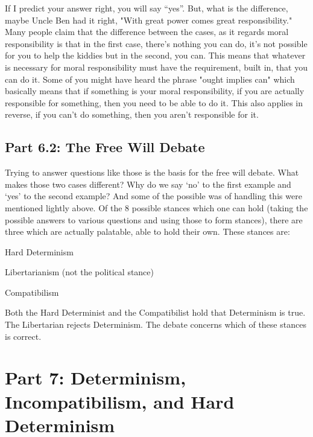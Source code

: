 
If I predict your answer right, you will say “yes”.  But, what is the difference, maybe Uncle Ben had it right, "With great power comes great responsibility." Many people claim that the difference between the cases, as it regards moral responsibility is that in the first case, there’s nothing you can do, it’s not possible for you to help the kiddies but in the second, you can.  This means that whatever is necessary for moral responsibility must have the requirement, built in, that you can do it. Some of you might have heard the phrase "ought implies can" which basically means that if something is your moral responsibility, if you are actually responsible for something, then you need to be able to do it. This also applies in reverse, if you can't do something, then you aren't responsible for it. 

\section{Part 6.2: The Free Will Debate}

Trying to answer questions like those is the basis for the free will debate. What makes those two cases different? Why do we say ‘no’ to the first example and ‘yes’ to the second example? And some of the possible was of handling this were mentioned lightly above. Of the 8 possible stances which one can hold (taking the possible answers to various questions and using those to form stances), there are three which are actually palatable, able to hold their own. These stances are:
\begin{earg}
   \item[]  Hard Determinism
    \item[] Libertarianism (not the political stance)
    \item[] Compatibilism 
\end{earg}
Both the Hard Determinist and the Compatibilist hold that Determinism is true. The Libertarian rejects Determinism. The debate concerns which of these stances is correct. 
\chapter{Part 7: Determinism, Incompatibilism, and Hard Determinism}
